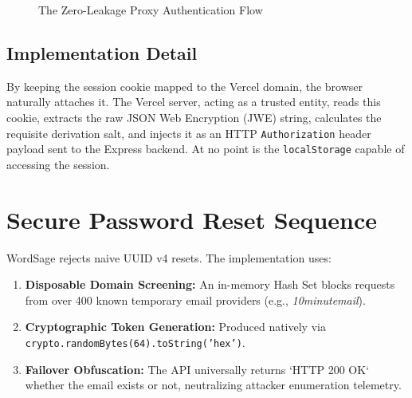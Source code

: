 \documentclass[12pt,a4paper]{report}
\begin{document}
\begin{figure}[H]
    \centering
    \caption{The Zero-Leakage Proxy Authentication Flow}
    \label{fig:auth_flow}
\end{figure}

\subsection{Implementation Detail}
By keeping the session cookie mapped to the Vercel domain, the browser naturally attaches it. The Vercel server, acting as a trusted entity, reads this cookie, extracts the raw JSON Web Encryption (JWE) string, calculates the requisite derivation salt, and injects it as an HTTP \texttt{Authorization} header payload sent to the Express backend. At no point is the \texttt{localStorage} capable of accessing the session.

\section{Secure Password Reset Sequence}
WordSage rejects naive UUID v4 resets. The implementation uses:
\begin{enumerate}
    \item \textbf{Disposable Domain Screening:} An in-memory Hash Set blocks requests from over 400 known temporary email providers (e.g., \textit{10minutemail}).
    \item \textbf{Cryptographic Token Generation:} Produced natively via \texttt{crypto.randomBytes(64).toString('hex')}.
    \item \textbf{Failover Obfuscation:} The API universally returns `HTTP 200 OK` whether the email exists or not, neutralizing attacker enumeration telemetry.
\end{enumerate}
\end{document}
